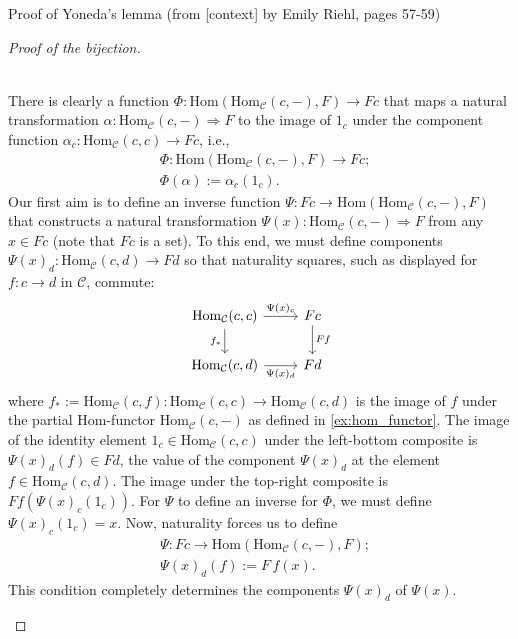 Proof of Yoneda's lemma (from [context] by Emily Riehl, pages 57-59)

\begin{proof}[Proof of the bijection]\begin{subproof}[\nopunct]\phantom{}\\
There is clearly a function $\Phi : \mathrm{Hom}(\mathrm{Hom}_{\mathcal{C}}(c,-), F) \rightarrow Fc$ that maps
a natural transformation $\alpha : \mathrm{Hom}_{\mathcal{C}}(c,-) \Rightarrow F$ to the image of $1_{c}$ under the component
function $\alpha_{c} : \mathrm{Hom}_{\mathcal{C}}(c,c) \rightarrow Fc$, i.e.,
\begin{align}
&\Phi : \mathrm{Hom}(\mathrm{Hom}_{\mathcal{C}}(c,-), F) \rightarrow Fc; \\
&\Phi(\alpha) := \alpha_{c}(1_{c}).
\end{align}
Our first aim is to define an inverse function $\Psi : Fc \rightarrow \mathrm{Hom}(\mathrm{Hom}_{\mathcal{C}}(c,-), F)$ that constructs a
natural transformation $\Psi(x) : \mathrm{Hom}_{\mathcal{C}}(c,-) \Rightarrow F$ from any $x \in Fc$ (note that $Fc$ is a set). To this end,
we must define components $\Psi(x)_{d} : \mathrm{Hom}_{\mathcal{C}}(c,d) \rightarrow Fd$ so that naturality squares, such as displayed for
$f : c \rightarrow d$ in $\mathcal{C}$, commute:
\[
\begin{tikzcd}
{\mathrm{Hom}_{\mathcal{C}}(c,c)} \arrow[r, "\Psi(x)_{c}"] \arrow[d, "f_{*}"'] & Fc \arrow[d, "Ff"] \\
{\mathrm{Hom}_{\mathcal{C}}(c,d)} \arrow[r, "\Psi(x)_{d}"']                    & Fd                
\end{tikzcd}
\]
where $f_{*} := \mathrm{Hom}_{\mathcal{C}}(c,f) : \mathrm{Hom}_{\mathcal{C}}(c,c) \rightarrow \mathrm{Hom}_{\mathcal{C}}(c,d)$
is the image of $f$ under the partial Hom-functor $\mathrm{Hom}_{\mathcal{C}}(c,-)$ as defined in \ref{ex:hom_functor}.
The image of the identity element $1_{c} \in \mathrm{Hom}_{\mathcal{C}}(c,c)$ under the left-bottom composite is
$\Psi(x)_{d}(f) \in Fd$, the value of the component $\Psi(x)_{d}$ at the element $f \in \mathrm{Hom}_{\mathcal{C}}(c,d)$. The image under
the top-right composite is $Ff(\Psi(x)_{c}(1_{c}))$. For $\Psi$ to define an inverse for $\Phi$, we must define
$\Psi(x)_{c}(1_{c}) = x$. Now, naturality forces us to define
\begin{align}\label{eq:Yoneda-Inverse_Psi}
&\Psi : Fc \rightarrow \mathrm{Hom}(\mathrm{Hom}_{\mathcal{C}}(c,-),F); \\
&\Psi(x)_{d}(f) := F\,f(x).
\end{align}
This condition completely determines the components $\Psi(x)_{d}$ of $\Psi(x)$.


\end{subproof}
\end{proof}
